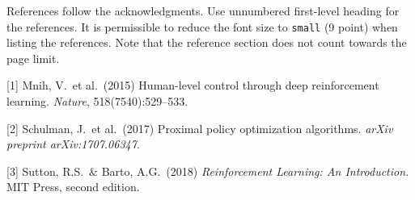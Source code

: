 \documentclass{article}
\begin{document}
References follow the acknowledgments. Use unnumbered first-level heading for
the references. It is permissible to reduce the font size to \verb+small+
(9 point) when listing the references. Note that the reference section does
not count towards the page limit.

\medskip

{
\small

[1] Mnih, V.\ et al.\ (2015) Human-level control through deep reinforcement
learning. {\it Nature}, 518(7540):529--533.

[2] Schulman, J.\ et al.\ (2017) Proximal policy optimization algorithms.
{\it arXiv preprint arXiv:1707.06347}.

[3] Sutton, R.S.\ \& Barto, A.G.\ (2018) {\it Reinforcement Learning: An
Introduction.} MIT Press, second edition.

}

\end{document}
